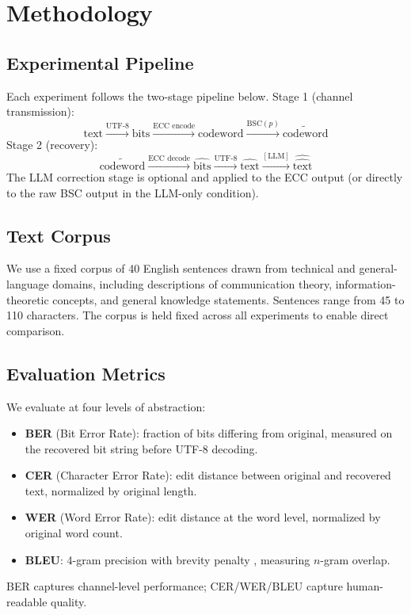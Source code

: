 \section{Methodology}
\label{sec:methodology}

\subsection{Experimental Pipeline}

Each experiment follows the two-stage pipeline below.
Stage 1 (channel transmission):
\[
  \text{text} \xrightarrow{\text{UTF-8}} \text{bits}
  \xrightarrow{\text{ECC encode}} \text{codeword}
  \xrightarrow{\mathrm{BSC}(p)} \tilde{\text{codeword}}
\]
Stage 2 (recovery):
\[
  \tilde{\text{codeword}}
  \xrightarrow{\text{ECC decode}} \hat{\text{bits}}
  \xrightarrow{\text{UTF-8}} \hat{\text{text}}
  \xrightarrow{[\text{LLM}]} \hat{\hat{\text{text}}}
\]
The LLM correction stage is optional and applied to the ECC output (or directly
to the raw BSC output in the LLM-only condition).

\subsection{Text Corpus}

We use a fixed corpus of 40 English sentences drawn from technical and
general-language domains, including descriptions of communication theory,
information-theoretic concepts, and general knowledge statements.  Sentences
range from 45 to 110 characters.  The corpus is held fixed across all
experiments to enable direct comparison.

\subsection{Evaluation Metrics}

We evaluate at four levels of abstraction:
\begin{itemize}
  \item \textbf{BER} (Bit Error Rate): fraction of bits differing from original, measured on the recovered bit string before UTF-8 decoding.
  \item \textbf{CER} (Character Error Rate): edit distance between original and recovered text, normalized by original length.
  \item \textbf{WER} (Word Error Rate): edit distance at the word level, normalized by original word count.
  \item \textbf{BLEU}: 4-gram precision with brevity penalty \cite{papineni2002}, measuring $n$-gram overlap.
\end{itemize}
BER captures channel-level performance; CER/WER/BLEU capture human-readable quality.

